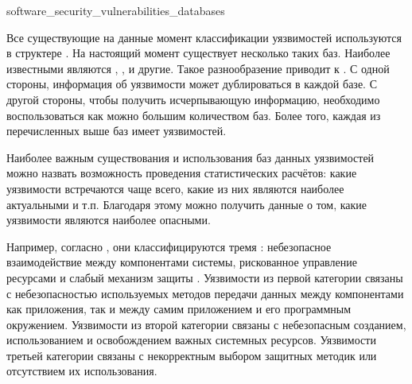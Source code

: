 	{software_security_vulnerabilities_databases}

%
Все существующие на данные момент классификации уязвимостей используются в структере .
%
На настоящий момент существует несколько таких баз. 
%
Наиболее известными являются  ,  ,   и другие. 
%
Такое разнообразение приводит к .
%
С одной стороны, информация об уязвимости может дублироваться в каждой базе.
%
С другой стороны, чтобы получить исчерпывающую информацию, необходимо воспользоваться как можно большим количеством баз.
%
Более того, каждая из перечисленных выше баз имеет  уязвимостей.

%
Наиболее важным  существования и использования баз данных уязвимостей можно назвать возможность проведения статистических расчётов: какие уязвимости встречаются чаще всего, какие из них являются наиболее актуальными и т.п.
%
Благодаря этому можно получить данные о том, какие уязвимости являются наиболее опасными. 

%
Например, согласно , они классифицируются тремя : небезопасное взаимодействие между компонентами системы, рискованное управление ресурсами и слабый механизм защиты .
%
Уязвимости из первой категории связаны с небезопасностью используемых методов передачи данных между компонентами как приложения, так и между самим приложением и его программным окружением. 
%
Уязвимости из второй категории связаны с небезопасным созданием, использованием и освобождением важных системных ресурсов. 
%
Уязвимости третьей категории связаны с некорректным выбором защитных методик или отсутствием их использования.